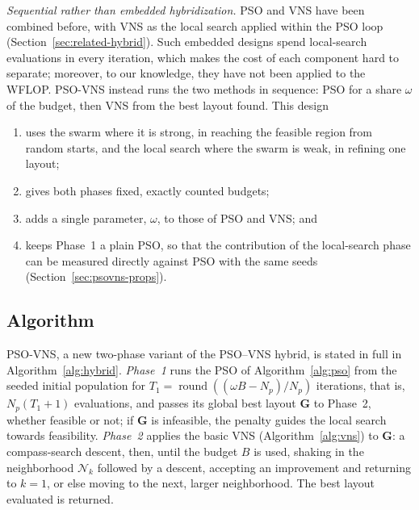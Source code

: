 \emph{Sequential rather than embedded hybridization.} PSO and VNS have been combined before, with VNS as the local search applied within the PSO loop~\cite{Tasgetiren2007,Marinakis2017,Gumaida2019} (Section~\ref{sec:related-hybrid}). Such embedded designs spend local-search evaluations in every iteration, which makes the cost of each component hard to separate; moreover, to our knowledge, they have not been applied to the WFLOP. PSO-VNS instead runs the two methods in sequence: PSO for a share $\omega$ of the budget, then VNS from the best layout found. This design
\begin{enumerate}
\item[(i)] uses the swarm where it is strong, in reaching the feasible region from random starts, and the local search where the swarm is weak, in refining one layout;
\item[(ii)] gives both phases fixed, exactly counted budgets;
\item[(iii)] adds a single parameter, $\omega$, to those of PSO and VNS; and
\item[(iv)] keeps Phase~1 a plain PSO, so that the contribution of the local-search phase can be measured directly against PSO with the same seeds (Section~\ref{sec:psovns-props}).
\end{enumerate}

\subsection{Algorithm}
\label{sec:psovns-alg}
PSO-VNS, a new two-phase variant of the PSO--VNS hybrid, is stated in full in Algorithm~\ref{alg:hybrid}. \emph{Phase~1} runs the PSO of Algorithm~\ref{alg:pso} from the seeded initial population for $T_1=\operatorname{round}((\omega B-N_p)/N_p)$ iterations, that is, $N_p(T_1+1)$ evaluations, and passes its global best layout $\mathbf G$ to Phase~2, whether feasible or not; if $\mathbf G$ is infeasible, the penalty guides the local search towards feasibility. \emph{Phase~2} applies the basic VNS (Algorithm~\ref{alg:vns}) to $\mathbf G$: a compass-search descent, then, until the budget $B$ is used, shaking in the neighborhood $\mathcal N_k$ followed by a descent, accepting an improvement and returning to $k=1$, or else moving to the next, larger neighborhood. The best layout evaluated is returned.

